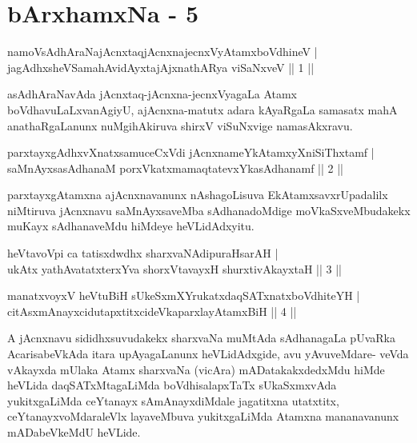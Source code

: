 \chapter{bArxhamxNa - 5}


\begin{shl}
namoV\s sAdhAraNajAcnxtaqjAcnxnajecnxVyAtamxboVdhineV |\\
jagAdhxsheVSamahAvidAyxtajAjxnathARya viSaNxveV \hfill || 1 ||
\end{shl}

\begin{artha}
asAdhAraNavAda jAcnxtaq-jAcnxna-jecnxVyagaLa Atamx boVdhavuLaLxvanAgiyU, ajAcnxna-matutx adara kAyaRgaLa samasatx mahA anathaRgaLanunx nuMgihAkiruva shirxV viSuNxvige namasAkxravu.
\end{artha}

\begin{shl}
parxtayxgAdhxvXnatxsamuceCxVdi jAcnxnameYkAtamxyXniSiThxtamf |\\
saMnAyxsasAdhanaM porxVkatxmamaqtatevxYkasAdhanamf \hfill || 2 ||
\end{shl}

\begin{artha}
parxtayxgAtamxna ajAcnxnavanunx nAshagoLisuva EkAtamxsavxrUpadalilx niMtiruva jAcnxnavu saMnAyxsaveMba sAdhanadoMdige moVkaSxveMbudakekx muKayx sAdhanaveMdu hiMdeye heVLidAdxyitu.
\end{artha}


\begin{shl}
heVtavoV\s pi ca tatisxdwdhx sharxvaNAdipuraHsarAH |\\
ukAtx yathAvatatxterxYva shorxVtavayxH shurxtivAkayxtaH \hfill || 3 ||
\end{shl}
\begin{shl}
manatxvoyxV heVtuBiH sUkeSxmXYrukatxdaqSATxnatxboVdhiteYH |\\
citAsxmAnayxcidutapxtitxcideVkaparxlayAtamxBiH \hfill || 4 ||
\end{shl}

\begin{artha}
A jAcnxnavu sididhxsuvudakekx sharxvaNa muMtAda sAdhanagaLa pUvaRka
AcarisabeVkAda itara upAyagaLanunx heVLidAdxgide, avu yAvuveMdare-
veVda vAkayxda mUlaka Atamx sharxvaNa (vicAra) mADatakakxdedxMdu hiMde
heVLida daqSATxMtagaLiMda boVdhisalapxTaTx sUkaSxmxvAda yukitxgaLiMda
ceYtanayx sAmAnayxdiMdale jagatitxna utatxtitx,
ceYtanayxvoMdaraleVlx layaveMbuva yukitxgaLiMda Atamxna mananavanunx
mADabeVkeMdU heVLide.
\end{artha}

